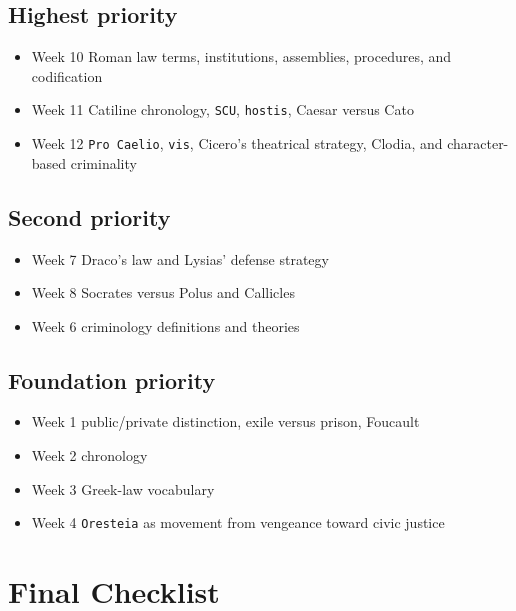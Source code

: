 \documentclass[11pt]{article}
\begin{document}
\subsection{Highest priority}

\begin{itemize}
\item Week 10 Roman law terms, institutions, assemblies, procedures, and codification
\item Week 11 Catiline chronology, \texttt{SCU}, \texttt{hostis}, Caesar versus Cato
\item Week 12 \texttt{Pro Caelio}, \texttt{vis}, Cicero's theatrical strategy, Clodia, and character-based criminality
\end{itemize}

\subsection{Second priority}

\begin{itemize}
\item Week 7 Draco's law and Lysias' defense strategy
\item Week 8 Socrates versus Polus and Callicles
\item Week 6 criminology definitions and theories
\end{itemize}

\subsection{Foundation priority}

\begin{itemize}
\item Week 1 public/private distinction, exile versus prison, Foucault
\item Week 2 chronology
\item Week 3 Greek-law vocabulary
\item Week 4 \texttt{Oresteia} as movement from vengeance toward civic justice
\end{itemize}

\section{Final Checklist}
\end{document}
